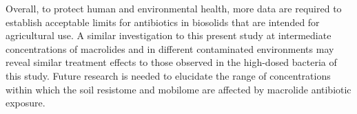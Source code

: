 Overall, to protect human and environmental health, more data are required to establish acceptable limits for antibiotics in biosolids that are intended for agricultural use.
A similar investigation to this present study at intermediate concentrations of macrolides and in different contaminated environments may reveal similar treatment effects to those observed in the high-dosed bacteria of this study.
Future research is needed to elucidate the range of concentrations within which the soil resistome and mobilome are affected by macrolide antibiotic exposure.
